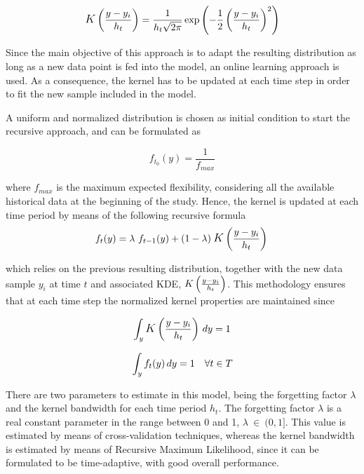 \begin{equation}
 \mathlarger{K}\left(\frac{y - y_{i}}{h_{t}}\right) = \frac{1}{h_{t} \sqrt{2 \pi}} \exp{\left(-\frac{1}{2}\left(\frac{y - y_{i}}{h_{t}}\right)^2\right) }
\end{equation}


Since the main objective of this approach is to adapt the resulting distribution as long as a new data point is fed into the model, an online learning approach is used. As a consequence, the kernel has to be updated at each time step in order to fit the new sample included in the model.

A uniform and normalized distribution is chosen as initial condition to start the recursive approach, and can be formulated as

\begin{equation}
    f_{t_{0}}(y) = \frac{1}{f_{max}}
\end{equation}

where $f_{max}$ is the maximum expected flexibility, considering all the available historical data at the beginning of the study. Hence, the kernel is updated at each time period by means of the following recursive formula 
\begin{equation} \label{eq:recursive_formula}
    f_{t}(y) = \lambda\ f_{t-1}(y) + (1-\lambda) \: \mathlarger{K}\left(\frac{y - y_{i}}{h_{t}}\right) \\
\end{equation}

which relies on the previous resulting distribution, together with the new data sample $y_{i}$ at time $t$ and associated KDE, $\mathlarger{K}\left(\frac{y - y_{i}}{h_{t}}\right)$. This methodology ensures that at each time step the normalized kernel properties are maintained since

\begin{equation}
  \int_{y} \mathlarger{K}\left(\frac{y - y_{i}}{h_{t}}\right) \, dy = 1 \\  
\end{equation}

\begin{equation}
  \int_{y} f_{t}(y) \, dy = 1  \quad \forall t \in T \\  
\end{equation}

There are two parameters to estimate in this model, being the forgetting factor $\lambda$ and the kernel bandwidth for each time period ${h}_{t}$. The forgetting factor $\lambda$ is a real constant parameter in the range between 0 and 1, $\lambda\ \in\ (0,1]$. This value is estimated by means of cross-validation techniques, whereas the kernel bandwidth is estimated by means of Recursive Maximum Likelihood, since it can be formulated to be time-adaptive, with good overall performance. 


